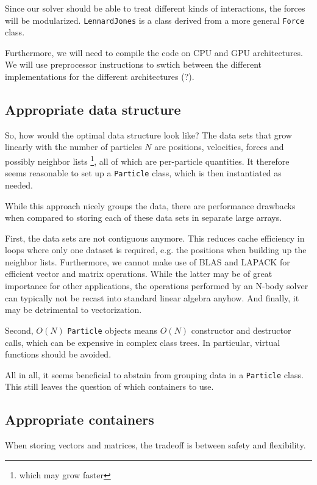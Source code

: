 \documentclass{scrartcl}
\begin{document}
Since our solver should be able to treat different kinds of interactions,
the forces will be modularized. \verb|LennardJones| is a class derived
from a more general \verb|Force|  class.

Furthermore, we will need to compile the code on CPU and GPU architectures. 
We will use preprocessor instructions to swtich between the different
implementations for the different architectures (?).

\subsection{Appropriate data structure}
So, how would the optimal data structure look like?
The data sets that grow linearly with the number of particles $N$
are positions, velocities, forces and possibly neighbor lists%
\footnote{which may grow faster}, 
all of which are per-particle quantities.
It therefore seems reasonable to set up a
\verb|Particle| class, which is then instantiated as needed.

While this approach nicely groups the data,
there are performance drawbacks when compared to
storing each of these data sets in separate large arrays.

First, the data sets are not contiguous anymore.
This reduces cache efficiency in loops where only one 
dataset is required, e.g. the positions when building up
the neighbor lists.
Furthermore, we cannot make use of BLAS and LAPACK for efficient
vector and matrix operations. 
While the latter may be of great importance for other applications,
the operations performed by an N-body solver can typically not be recast
into standard linear algebra anyhow.
And finally, it may be detrimental to vectorization.

Second, $O(N)$ \verb|Particle| objects means $O(N)$ constructor
and destructor calls, which can be expensive in complex class trees.
In particular, virtual functions should be avoided.

All in all, it seems beneficial to abstain from 
grouping data in a \verb|Particle| class.
This still leaves the question of which containers to use.

\subsection{Appropriate containers}

When storing vectors and matrices, the tradeoff is between safety and
flexibility.
\end{document}
